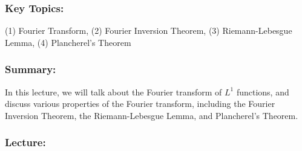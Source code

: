 \documentclass{article}
\begin{document}
\subsubsection{Key Topics:} (1) Fourier Transform, (2) Fourier Inversion Theorem, (3) Riemann-Lebesgue Lemma, (4) Plancherel's Theorem 

\subsubsection{Summary:} In this lecture, we will talk about the Fourier transform of $L^{1}$ functions, and discuss various properties of the Fourier transform, including the Fourier Inversion Theorem, the Riemann-Lebesgue Lemma, and Plancherel's Theorem. 

\subsubsection{Lecture:}
\end{document}

